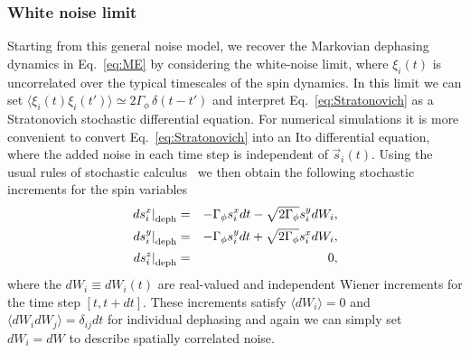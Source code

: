 \documentclass[pra,twocolumn,showpacs,preprintnumbers,amsmath,amssymb,superscriptaddress]{revtex4-1}
\newcommand{\erw}[1]{\langle#1\rangle}
\begin{document}
\subsubsection{White noise limit}
Starting from this general noise model, we recover the Markovian dephasing dynamics in Eq.~\eqref{eq:ME} by considering the white-noise limit, where $\xi_i(t)$ is uncorrelated over the typical timescales of the spin dynamics. In this limit we can set
$\langle \xi_i(t)\xi_i(t')\rangle\simeq 2\Gamma_\phi\, \delta(t-t')$ and interpret Eq.~\eqref{eq:Stratonovich} as a Stratonovich stochastic differential equation. For numerical simulations it is more convenient to convert Eq.~\eqref{eq:Stratonovich} into an Ito differential equation, where the added noise in each time step is independent of $\vec s_i(t)$. Using the usual rules of stochastic calculus~\cite{Gardiner} we then obtain the following stochastic increments for the spin variables
\begin{eqnarray}
\label{eq:itodephasing1}
 \left.ds_i^x\right|_{\rm deph} &=& -\Gamma_{\phi} s_i^x dt- \sqrt{2 \Gamma_\phi} s_i^y dW_i,\\
 \left.ds_i^y\right|_{\rm deph} &=&-\Gamma_{\phi} s_i^y dt+ \sqrt{2 \Gamma_\phi} s_i^x  dW_i,\\
 \left.ds_i^z\right|_{\rm deph} &=& 0,
\label{eq:itodephasing3}
\end{eqnarray}
where the $dW_i\equiv dW_i(t)$ are real-valued and independent Wiener increments for the time step $[t,t+dt]$. These increments satisfy $\erw{dW_i}=0$ and $\erw{dW_i dW_j}=\delta_{ij} dt$ for individual dephasing and again we can simply set $dW_i=dW$ to describe spatially correlated noise. 
\end{document}
